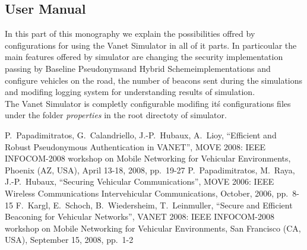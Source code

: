 \documentclass[a4paper,12pt]{article}
\def\baseline{Baseline Pseudonyms}
\def\hybrid{Hybrid Scheme}
\begin{document}
\subsection{User Manual}
In this part of this monography we explain the possibilities offred by configurations for using the Vanet Simulator in all of it parts. In particoular the main features offered by simulator are changing the security implementation passing by \baseline and \hybrid implementations and configure vehicles on the road, the number of beacons sent during the simulations and modifing logging system for understanding results of simulation.\\
The Vanet Simulator is completly configurable modifing it\'s configurations files under the folder \textit{properties} in the root directoty of simulator.


\begin{thebibliography}{99}
%
%
P.~Papadimitratos, G.~Calandriello, J.-P.~Hubaux, A.~Lioy,
``Efficient and Robust Pseudonymous Authentication in VANET'',
MOVE 2008: IEEE INFOCOM-2008 workshop on Mobile Networking for Vehicular Environments,
Phoenix (AZ, USA), April 13-18, 2008, pp.~19-27 
P.~Papadimitratos, M.~Raya, J.-P.~Hubaux,
``Securing Vehicular Communications'',
MOVE 2006: IEEE Wireless Communications Intervehicular Communications,
October, 2006, pp.~8-15 
F.~Kargl, E.~Schoch, B.~Wiedersheim, T.~Leinmuller,
``Secure and Efficient Beaconing for Vehicular Networks'',
VANET 2008: IEEE INFOCOM-2008 workshop on Mobile Networking for Vehicular Environments,
San Francisco (CA, USA), September 15, 2008, pp.~1-2 
\end{thebibliography}
\end{document}
